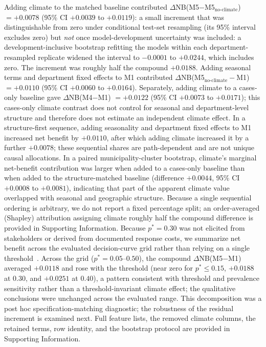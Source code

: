 \documentclass[11pt,a4paper]{article}
\begin{document}
Adding climate to the matched baseline contributed $\Delta$NB(M5$-$M5$_{\text{no-climate}}$) $=+0.0078$ (95\% CI $+0.0039$ to $+0.0119$): a small increment that was distinguishable from zero under conditional test-set resampling (its 95\% interval excludes zero) but \emph{not} once model-development uncertainty was included: a development-inclusive bootstrap refitting the models within each department-resampled replicate widened the interval to $-0.0001$ to $+0.0244$, which includes zero. The increment was roughly half the compound $+0.0188$. Adding seasonal terms and department fixed effects to M1 contributed $\Delta$NB(M5$_{\text{no-climate}}-$M1) $=+0.0110$ (95\% CI $+0.0060$ to $+0.0164$). Separately, adding climate to a cases-only baseline gave $\Delta$NB(M4$-$M1) $=+0.0122$ (95\% CI $+0.0073$ to $+0.0171$); this cases-only climate contrast does not control for seasonal and department-level structure and therefore does not estimate an independent climate effect. In a structure-first sequence, adding seasonality and department fixed effects to M1 increased net benefit by $+0.0110$, after which adding climate increased it by a further $+0.0078$; these sequential shares are path-dependent and are not unique causal allocations. In a paired municipality-cluster bootstrap, climate's marginal net-benefit contribution was larger when added to a cases-only baseline than when added to the structure-matched baseline (difference $+0.0044$, 95\% CI $+0.0008$ to $+0.0081$), indicating that part of the apparent climate value overlapped with seasonal and geographic structure. Because a single sequential ordering is arbitrary, we do not report a fixed percentage split; an order-averaged (Shapley) attribution assigning climate roughly half the compound difference is provided in Supporting Information. Because $p^*=0.30$ was not elicited from stakeholders or derived from documented response costs, we summarize net benefit across the evaluated decision-curve grid rather than relying on a single threshold~\cite{VanCalster2019,Vickers2016}. Across the grid ($p^*=0.05$--$0.50$), the compound $\Delta$NB(M5$-$M1) averaged $+0.0118$ and rose with the threshold (near zero for $p^*\le0.15$, $+0.0188$ at $0.30$, and $+0.0251$ at $0.40$), a pattern consistent with threshold and prevalence sensitivity rather than a threshold-invariant climate effect; the qualitative conclusions were unchanged across the evaluated range. This decomposition was a post hoc specification-matching diagnostic; the robustness of the residual increment is examined next. Full feature lists, the removed climate columns, the retained terms, row identity, and the bootstrap protocol are provided in Supporting Information.
\end{document}
